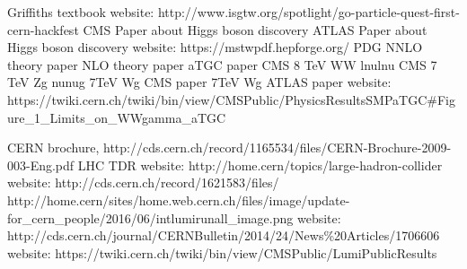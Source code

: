 \begin{thebibliography}{1}
 Griffiths textbook
 website: http://www.isgtw.org/spotlight/go-particle-quest-first-cern-hackfest
 CMS Paper about Higgs boson discovery
 ATLAS Paper about Higgs boson discovery
 website: https://mstwpdf.hepforge.org/
 PDG
 NNLO theory paper
 NLO theory paper
 aTGC paper
 CMS 8 TeV WW lnulnu
 CMS 7 TeV Zg nunug
 7TeV Wg CMS paper
 7TeV Wg ATLAS paper
 website: https://twiki.cern.ch/twiki/bin/view/CMSPublic/PhysicsResultsSMPaTGC\#Figure\_1\_Limits\_on\_WWgamma\_aTGC

 CERN brochure, http://cds.cern.ch/record/1165534/files/CERN-Brochure-2009-003-Eng.pdf
 LHC TDR
 website: http://home.cern/topics/large-hadron-collider
 website: http://cds.cern.ch/record/1621583/files/
 http://home.cern/sites/home.web.cern.ch/files/image/update-for\_cern\_people/2016/06/intlumirunall\_image.png 
 website: http://cds.cern.ch/journal/CERNBulletin/2014/24/News\%20Articles/1706606
 website: https://twiki.cern.ch/twiki/bin/view/CMSPublic/LumiPublicResults


\end{thebibliography}
